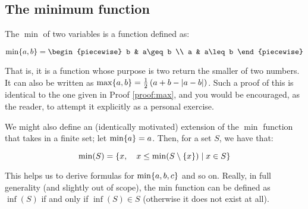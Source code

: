 \subsection{The minimum function}
The $\min$ of two variables is a function defined as:

$$
    \min\br{a,b}=\begin{piecewise}
        b & a\geq b \\
        a & a\leq b
    \end{piecewise}
$$

That is, it is a function whose purpose is two return the smaller of two numbers. It can also be written as $\max\{a,b\}=\frac{1}{2}\left(a+b-\abs{a-b}\right)$. Such a proof of this is identical to the one given in Proof \ref{proof:max}, and you would be encouraged, as the reader, to attempt it explicitly as a personal exercise.

We might also define an (identically motivated) extension of the $\min$ function that takes in a finite set; let $\min\{a\}=a$. Then, for a set $S$, we have that:

$$
    \min(S)=\left\{x,\quad x\leq\min(S\setminus\{x\})\mid x\in S\right\}
$$

This helps us to derive formulas for $\min\{a,b,c\}$ and so on. Really, in full generality (and slightly out of scope), the min function can be defined as $\inf(S)$ if and only if $\inf(S)\in S$ (otherwise it does not exist at all).


